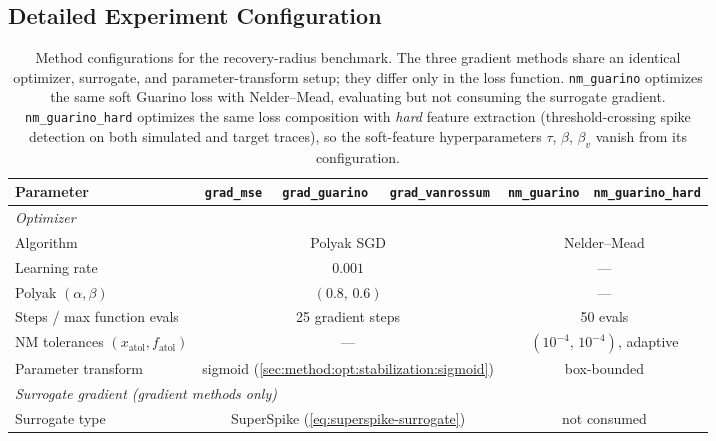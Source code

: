 \subsection{Detailed Experiment Configuration}
\begin{table}[h]
\centering
\caption{Method configurations for the recovery-radius benchmark. The three gradient methods share an identical optimizer, surrogate, and parameter-transform setup; they differ only in the loss function. \texttt{nm\_guarino} optimizes the same soft Guarino loss with Nelder--Mead, evaluating but not consuming the surrogate gradient. \texttt{nm\_guarino\_hard} optimizes the same loss composition with \emph{hard} feature extraction (threshold-crossing spike detection on both simulated and target traces), so the soft-feature hyperparameters $\tau$, $\beta$, $\beta_v$ vanish from its configuration.}
\label{tab:training-params}
\footnotesize
\setlength{\tabcolsep}{3pt}
\begin{tabular}{lccccc}
\toprule
\textbf{Parameter} & \texttt{grad\_mse} & \texttt{grad\_guarino} & \texttt{grad\_vanrossum} & \texttt{nm\_guarino} & \texttt{nm\_guarino\_hard} \\
\midrule
\multicolumn{6}{l}{\textit{Optimizer}} \\
Algorithm                 & \multicolumn{3}{c}{Polyak SGD}                                & \multicolumn{2}{c}{Nelder--Mead} \\
Learning rate             & \multicolumn{3}{c}{$0.001$}                                   & \multicolumn{2}{c}{---} \\
Polyak $(\alpha,\beta)$   & \multicolumn{3}{c}{$(0.8,\,0.6)$}                             & \multicolumn{2}{c}{---} \\
Steps / max function evals & \multicolumn{3}{c}{25 gradient steps}                         & \multicolumn{2}{c}{50 evals} \\
NM tolerances $(x_{\text{atol}}, f_{\text{atol}})$ & \multicolumn{3}{c}{---}                & \multicolumn{2}{c}{$(10^{-4},\,10^{-4})$, adaptive} \\
Parameter transform       & \multicolumn{3}{c}{sigmoid (\cref{sec:method:opt:stabilization:sigmoid})} & \multicolumn{2}{c}{box-bounded} \\
\midrule
\multicolumn{6}{l}{\textit{Surrogate gradient (gradient methods only)}} \\
Surrogate type            & \multicolumn{3}{c}{SuperSpike (\cref{eq:superspike-surrogate})} & \multicolumn{2}{c}{not consumed} \\

\end{tabular}
\end{table}
